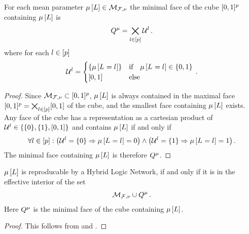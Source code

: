 \begin{lemma}
    \label{lem:minimalContainingFace}
    For each mean parameter $\mu\left[L\right]\in\mathcal{M}_{\mathcal{F},\nu}$ the minimal face of the cube $[0,1]^{p}$ containing $\mu\left[L\right]$ is
    \begin{align*}
        Q^{\mu}
        = \bigtimes_{l\in[p]} \mathcal{U}^{l} \, .
    \end{align*}
    where for each $l\in[p]$
    \begin{align*}
        \mathcal{U}^{l} = \begin{cases}
                                   \{\mu\left[L_{}=l_{}\right]\} & \text{if} \quad \mu\left[L_{}=l_{}\right] \in \{0,1\} \\
                                   [0,1] & \text{else}
        \end{cases} \, .
    \end{align*}
\end{lemma}
\begin{proof}
    Since $\mathcal{M}_{\mathcal{F},\nu}\subset[0,1]^{p}$, $\mu\left[L\right]$ is always contained in the maximal face $[0,1]^{p}=\bigtimes_{l\in[p]}[0,1]$ of the cube, and the smallest face containing $\mu\left[L\right]$ exists.
    Any face of the cube has a representation as a cartesian product of $\mathcal{U}^{l}\in\{\{0\},\{1\},[0,1]\}$ and contains $\mu\left[L\right]$ if and only if
    \begin{align*}
        \forall{l\in[p]}:{\left(\mathcal{U}^{l}=\{0\} \Rightarrow \mu\left[L_{}=l_{}\right]=0 \right) \land \left(\mathcal{U}^{l}=\{1\} \Rightarrow \mu\left[L_{}=l_{}\right]=1 \right)} \, .
    \end{align*}
    The minimal face containing $\mu\left[L\right]$ is therefore $Q^{\mu}$.
\end{proof}

\begin{theorem}
    $\mu\left[L\right]$ is reproducable by a Hybrid Logic Network, if and only if it is in the effective interior of the set
    \begin{align*}
        \mathcal{M}_{\mathcal{F},\nu}\cup Q^{\mu} \, .
    \end{align*}
    Here $Q^{\mu}$ is the minimal face of the cube containing $\mu\left[L\right]$.
\end{theorem}
\begin{proof}
    This follows from  and .
\end{proof}

